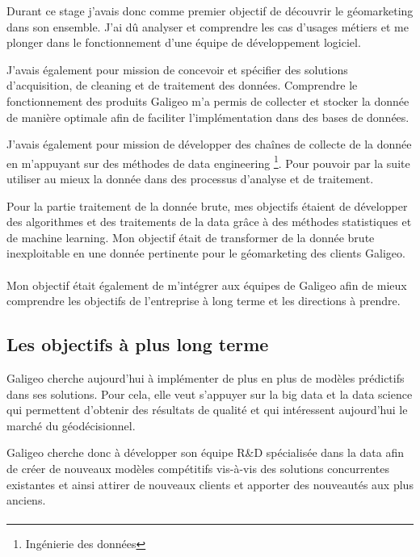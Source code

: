Durant ce stage j’avais donc comme premier objectif de découvrir le géomarketing dans son ensemble. J’ai dû analyser et comprendre les cas d’usages métiers et me plonger dans le fonctionnement d’une équipe de développement logiciel.

J’avais également pour mission de concevoir et spécifier des solutions d’acquisition, de cleaning et de traitement des données. Comprendre le fonctionnement des produits Galigeo m’a permis de collecter et stocker la donnée de manière optimale afin de faciliter l’implémentation dans des bases de données.

J’avais également pour mission de développer des chaînes de collecte de la donnée en m’appuyant sur des méthodes de data engineering \footnote{Ingénierie des données}. Pour pouvoir par la suite utiliser au mieux la donnée dans des processus d’analyse et de traitement.

Pour la partie traitement de la donnée brute, mes objectifs étaient de développer des algorithmes et des traitements de la data grâce à des méthodes statistiques et de machine learning. Mon objectif était de transformer de la donnée brute inexploitable en une donnée pertinente pour le géomarketing des clients Galigeo.

\paragraph*{}

Mon objectif était également de m’intégrer aux équipes de Galigeo afin de mieux comprendre les objectifs de l’entreprise à long terme et les directions à prendre.


\subsection{Les objectifs à plus long terme}

Galigeo cherche aujourd’hui à implémenter de plus en plus de modèles prédictifs dans ses solutions. Pour cela, elle veut s’appuyer sur la big data et la data science qui permettent d’obtenir des résultats de qualité et qui intéressent aujourd’hui le marché du géodécisionnel.

Galigeo cherche donc à développer son équipe R\&D spécialisée dans la data afin de créer de nouveaux modèles compétitifs vis-à-vis des solutions concurrentes existantes et ainsi attirer de nouveaux clients et apporter des nouveautés aux plus anciens.

\paragraph*{}


